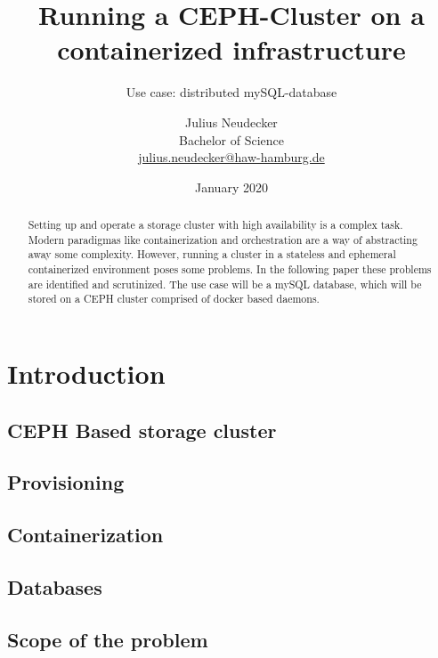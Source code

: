 \documentclass[titlepage, a4paper, 11pt]{scrartcl}
\title{Running a CEPH-Cluster on a containerized infrastructure}
\subtitle{Use case: distributed mySQL-database}
\author{Julius Neudecker \\ Bachelor of Science \\ \href{mailto:julius.neudecker@haw-hamburg.de}{julius.neudecker@haw-hamburg.de}}
\date{January 2020}
\begin{document}
    \maketitle

    \tableofcontents

    \begin{abstract}
        Setting up and operate a storage cluster with high availability is a complex task. Modern paradigmas like containerization
        and orchestration are a way of abstracting away some complexity. However, running a cluster in a stateless and ephemeral
        containerized environment poses some problems. In the following paper these problems are identified and scrutinized.
        The use case will be a mySQL database, which will be stored on a CEPH cluster comprised of docker based daemons.
    \end{abstract}

    \section{Introduction}

        \subsection{CEPH Based storage cluster}

        \subsection{Provisioning}

        \subsection{Containerization}

        \subsection{Databases}

        \subsection{Scope of the problem}
\end{document}
